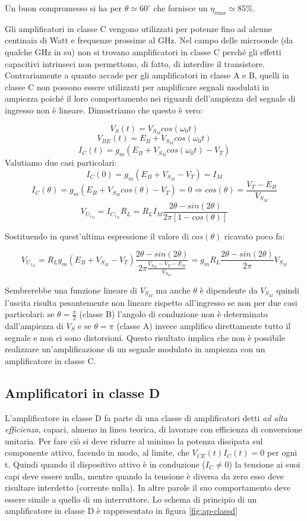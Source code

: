 Un buon compromesso si ha per $\theta \simeq 60^\circ$ che fornisce un $\eta_{max} \simeq 85\%$.

Gli amplificatori in classe C vengono utilizzati per potenze fino ad alcune centinaia di Watt e
frequenze prossime al GHz.
Nel campo delle microonde (da qualche GHz in su) non si trovano amplificatori in classe C perché
gli effetti capacitivi intrinseci non permettono, di fatto, di interdire il transistore.
Contrariamente a quanto accade per gli amplificatori in classe A e B, quelli in classe C non
possono essere utilizzati per amplificare segnali modulati in ampiezza poiché il loro comportamento
nei riguardi dell'ampiezza del segnale di ingresso non è lineare. Dimostriamo che questo è vero:

\[V_S(t) = V_{S_M} cos(\omega_0 t)\]
\[V_{BE}(t) = E_B +  V_{S_M} cos(\omega_0 t)\]
\[I_C(t) = g_m (E_B +  V_{S_M} cos(\omega_0 t) - V_T )\]
Valutiamo due casi particolari:
\[I_C(0) = g_m(E_B + V_{S_M} - V_T ) = I_M \]
\[I_C(\theta) = g_m(E_B + V_{S_M}cos(\theta) - V_T ) = 0 \Rightarrow cos(\theta) = \frac{V_T - E_B}{V_{S_M}}\]
\[V_{U_{1_M}} = I_{C_{1_M}} R_L = R_L I_M \frac{2\theta-sin(2\theta)}{2\pi \left[1-cos(\theta)\right]} \]

Sostituendo in quest'ultima espressione il valore di $cos(\theta)$ ricavato poco fa:

\[V_{U_{1_M}} = R_L g_m(E_B + V_{S_M} - V_T )\frac{2\theta-sin(2\theta)}{2\pi\frac{V_{S_M}-V_T-E_B}{V_{S_M}}} = g_m R_L \frac{2\theta - sin(2\theta)}{2\pi}V_{S_M}\]

Sembrerebbe una funzione lineare di $V_{S_M}$ ma anche $\theta$ è dipendente da $V_{S_M}$ quindi l'uscita risulta pesantemente non lineare rispetto all'ingresso se non per due casi particolari: se $\theta = \frac{\pi}{2}$ (classe B) l'angolo di conduzione non è determinato dall'ampiezza di $V_S$ e se $\theta = \pi$ (classe A) invece amplifico direttamente tutto il segnale e non ci sono distorsioni. Questo risultato implica che non è possibile realizzare un'amplificazione di un segnale modulato in ampiezza con un amplificatore in classe C. 

\subsection{Amplificatori in classe D}
L'amplificatore in classe D fa parte di una classe di amplificatori detti \textit{ad alta efficienza}, capaci,
almeno in linea teorica, di lavorare con efficienza di conversione unitaria. Per fare ciò si deve
ridurre al minimo la potenza dissipata sul componente attivo, facendo in modo, al limite, che
$V_{CE} (t) I_C (t) = 0$ per ogni t. Quindi quando il dispositivo attivo è in conduzione ($I_C \neq 0$) la tensione ai
suoi capi deve essere nulla, mentre quando la tensione è diversa da zero esso deve risultare
interdetto (corrente nulla). In altre parole il suo comportamento deve essere simile a quello di un
interruttore.
Lo schema di principio di un amplificatore in classe D è rappresentato in figura \ref{fig:ap-classd}

